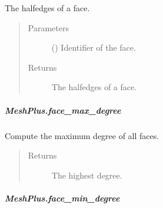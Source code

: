 \documentclass[letterpaper,10pt,english]{sphinxmanual}
\begin{document}
\begin{fulllineitems}
\begin{fulllineitems}
\label{\detokenize{api/generated/directional_clustering.mesh.MeshPlus.face_halfedges:directional_clustering.mesh.MeshPlus.face_halfedges}}
The halfedges of a face.
\begin{quote}\begin{description}
\item[{Parameters}] \leavevmode
{} () \textendash{} Identifier of the face.

\item[{Returns}] \leavevmode
{} \textendash{} The halfedges of a face.

\end{description}\end{quote}

\end{fulllineitems}



\subparagraph{MeshPlus.face\_max\_degree}
\label{\detokenize{api/generated/directional_clustering.mesh.MeshPlus.face_max_degree:meshplus-face-max-degree}}\label{\detokenize{api/generated/directional_clustering.mesh.MeshPlus.face_max_degree::doc}}

\begin{fulllineitems}
\label{\detokenize{api/generated/directional_clustering.mesh.MeshPlus.face_max_degree:directional_clustering.mesh.MeshPlus.face_max_degree}}
Compute the maximum degree of all faces.
\begin{quote}\begin{description}
\item[{Returns}] \leavevmode
{} \textendash{} The highest degree.

\end{description}\end{quote}

\end{fulllineitems}



\subparagraph{MeshPlus.face\_min\_degree}
\label{\detokenize{api/generated/directional_clustering.mesh.MeshPlus.face_min_degree:meshplus-face-min-degree}}\label{\detokenize{api/generated/directional_clustering.mesh.MeshPlus.face_min_degree::doc}}


\end{fulllineitems}
\end{document}
